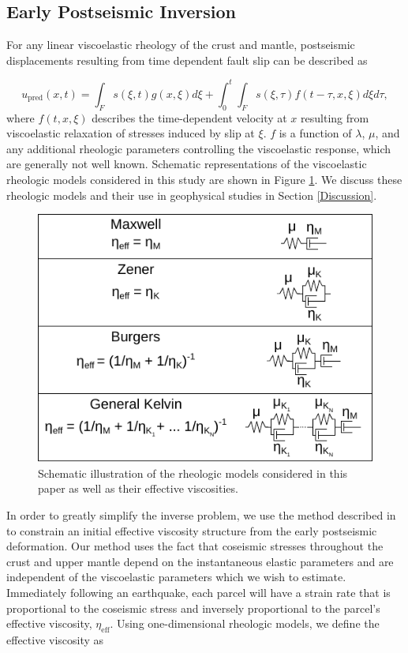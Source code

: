 \documentclass[draft,linenumbers]{AGUJournal}
\begin{document}
\subsection{Early Postseismic Inversion}\label{sec:InitialInversion}
For any linear viscoelastic rheology of the crust and mantle, postseismic displacements resulting from time dependent fault slip can be described as  

\begin{equation}\label{GeneralForward}
  u_\mathrm{pred}(x,t) = \int_F s(\xi,t)g(x,\xi)d\xi + 
           \int_0^t\int_F s(\xi,\tau) f(t-\tau,x,\xi) d\xi d\tau,
\end{equation}
where $f(t,x,\xi)$ describes the time-dependent velocity at $x$ resulting from viscoelastic relaxation of stresses induced by slip at $\xi$. $f$ is a function of $\lambda$, $\mu$, and any additional rheologic parameters controlling the viscoelastic response, which are generally not well known. Schematic representations of the viscoelastic rheologic models considered in this study are shown in Figure \ref{fig:Rheology}.  We discuss these rheologic models and their use in geophysical studies in Section \ref{Discussion}. 

\begin{figure}
\includegraphics[scale=0.9]{Figures/2016jb013114-f08}
\centering 
\caption{Schematic illustration of the rheologic models considered in this paper as well as their effective viscosities.}
\label{fig:Rheology}
\end{figure}

In order to greatly simplify the inverse problem, we use the method described in \citet{Hines2016} to constrain an initial effective viscosity structure from the early postseismic deformation.  Our method uses the fact that coseismic stresses throughout the crust and upper mantle depend on the instantaneous elastic parameters and are independent of the viscoelastic parameters which we wish to estimate. Immediately following an earthquake, each parcel will have a strain rate that is proportional to the coseismic stress and inversely proportional to the parcel's effective viscosity, $\eta_\mathrm{eff}$.  Using one-dimensional rheologic models, we define the effective viscosity as
\end{document}
